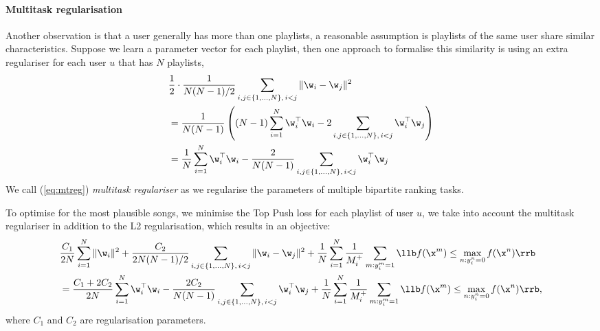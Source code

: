 \paragraph{Multitask regularisation}
Another observation is that a user generally has more than one playlists,
a reasonable assumption is playlists of the same user share similar characteristics. 
Suppose we learn a parameter vector for each playlist, then one approach to formalise this similarity is using an extra regulariser
for each user $u$ that has $N$ playlists,
\begin{equation}
\label{eq:mtreg}
\begin{aligned}
&\frac{1}{2} \cdot \frac{1}{N (N - 1) / 2} \sum_{i, j \in \{1,\dots,N\}, \, i < j} \| \w_i - \w_j \|^2 \\
&= \frac{1}{N (N - 1)} \left( (N - 1) \sum_{i=1}^{N} \w_i^\top \w_i - 2 \sum_{i, j \in \{1,\dots,N\}, \, i < j} \w_i^\top \w_j \right) \\
&= \frac{1}{N} \sum_{i=1}^{N} \w_i^\top \w_i - \frac{2}{N (N - 1)} \sum_{i, j \in \{1,\dots,N\}, \, i < j} \w_i^\top \w_j %
\end{aligned}
\end{equation}
We call (\ref{eq:mtreg}) \emph{multitask regulariser} as we regularise the parameters of multiple bipartite ranking tasks. 

To optimise for the most plausible songs, we minimise the Top Push loss for each playlist of user $u$, 
we take into account the multitask regulariser in addition to the L2 regularisation, 
which results in an objective:
\begin{equation}
\label{eq:mtobj}
\begin{aligned}
&\frac{C_1}{2 N} \sum_{i=1}^{N} \| \w_i \|^2
+ \frac{C_2}{2 N (N - 1) / 2} \sum_{i, j \in \{1,\dots,N\}, \, i < j} \| \w_i - \w_j \|^2 
+ \frac{1}{N} \sum_{i = 1}^{N} \frac{1}{M_i^+} \sum_{m: y_i^m = 1} \llb f(\x^m) \le \max_{n: y_i^n = 0} f(\x^n) \rrb \\
&= \frac{C_1 + 2C_2}{2 N} \sum_{i=1}^{N} \w_i^\top \w_i 
- \frac{2C_2}{N (N - 1)} \sum_{i, j \in \{1,\dots,N\}, \, i < j} \w_i^\top \w_j
+ \frac{1}{N} \sum_{i = 1}^{N} \frac{1}{M_i^+} \sum_{m: y_i^m = 1} \llb f(\x^m) \le \max_{n: y_i^n = 0} f(\x^n) \rrb,
\end{aligned}
\end{equation}
where $C_1$ and $C_2$ are regularisation parameters.

